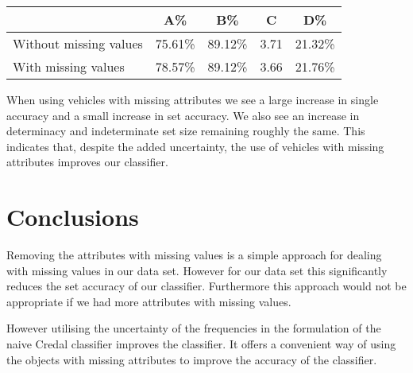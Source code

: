 \begin{center}
\begin{tabular}{l|c c c c}
	                       & A\%     & B\%     & C    & D\%     \\
	\hline
	Without missing values & 75.61\% & 89.12\% & 3.71 & 21.32\% \\
	With missing values    & 78.57\% & 89.12\% & 3.66 & 21.76\% \\
\end{tabular}
\end{center}

When using vehicles with missing attributes we see a large increase in single accuracy and a small increase in set accuracy. We also see an increase in determinacy and indeterminate set size remaining roughly the same.
This indicates that, despite the added uncertainty, the use of vehicles with missing attributes improves our classifier.

\section{Conclusions}

Removing the attributes with missing values is a simple approach for dealing with missing values in our data set.
However for our data set this significantly reduces the set accuracy of our classifier.
Furthermore this approach would not be appropriate if we had more attributes with missing values.

However utilising the uncertainty of the frequencies in the formulation of the naive Credal classifier improves the classifier.
It offers a convenient way of using the objects with missing attributes to improve the accuracy of the classifier.

